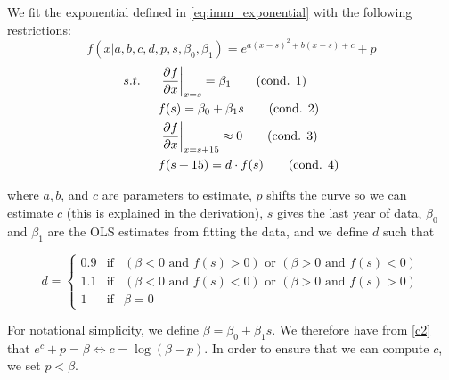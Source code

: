 \documentclass[10pt]{article}
\renewcommand{\thesection}{\arabic{section}}
\renewcommand{\thesubsection}{\thesection.\arabic{subsection}}
\renewcommand{\thesubsubsection}{\thesubsection.\arabic{subsubsection}}
\renewcommand{\subsection}[2][]{\oldsubsection[#1]{#2}\index{#1}\label{sec:\thesubsection}}
\renewcommand{\subsubsection}[2][]{\oldsubsubsection[#1]{#2}\index{#1}\label{sec:\thesubsubsection}}
\numberwithin{equation}{subsection}
\begin{document}
\begin{appendices}

\subsubsection{Immigration Rates}

\noindent
We fit the exponential defined in \ref{eq:imm_exponential} with the following restrictions:
\begin{equation}
   f(x|a, b, c, d, p, s, \beta_0, \beta_1) = e^{a(x-s)^2 + b(x-s) + c} + p \tag{3.1 eqn. 4}
\end{equation}
\begin{align*}
   s.t. \hspace{5mm} &\left.\pdv{f}{x}\right|_{x=s} = \beta_1 \tag{cond. 1} \label{c1} \\
   &f(s) = \beta_0 + \beta_1 s \tag{cond. 2} \label{c2} \\
   &\left.\pdv{f}{x}\right|_{x=s + 15} \approx 0 \tag{cond. 3} \label{c3} \\
   &f(s + 15) = d \cdot f(s) \tag{cond. 4} \label{c4}
\end{align*}

\noindent where \(a, b\), and \(c\) are parameters to estimate, \(p\) shifts the curve so we can estimate \(c\) (this is explained in the derivation), \(s\) gives the last year of data, \(\beta_0\) and \(\beta_1\) are the OLS estimates from fitting the data, and we define \(d\) such that

\[
   d = \left\{\begin{matrix}
      0.9 & \text{if} & (\beta < 0 \text{ and } f(s) > 0) \text{ or } (\beta > 0 \text{ and } f(s) < 0) \\
      1.1 & \text{if} & (\beta < 0 \text{ and } f(s) < 0) \text{ or } (\beta > 0 \text{ and } f(s) > 0) \\
      1 & \text{if} & \beta = 0
   \end{matrix}\right.
\]

\par For notational simplicity, we define \(\beta = \beta_0 + \beta_1s\). We therefore have from \ref{c2} that \(e^c + p = \beta \Leftrightarrow c = \log(\beta - p)\). In order to ensure that we can compute \(c\), we set \(p < \beta\).


\end{appendices}
\end{document}

